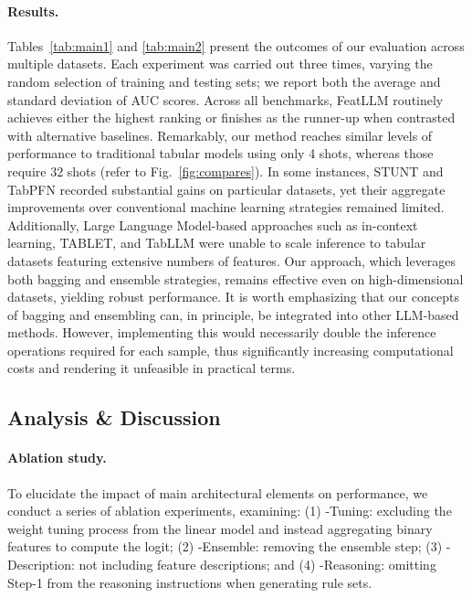 \vspace*{-0.12in}
\paragraph{Results.}
Tables~\ref{tab:main1} and \ref{tab:main2} present the outcomes of our evaluation across multiple datasets. Each experiment was carried out three times, varying the random selection of training and testing sets; we report both the average and standard deviation of AUC scores. Across all benchmarks, \textsf{FeatLLM} routinely achieves either the highest ranking or finishes as the runner-up when contrasted with alternative baselines. Remarkably, our method reaches similar levels of performance to traditional tabular models using only 4 shots, whereas those require 32 shots (refer to Fig.~\ref{fig:compares}). In some instances, STUNT and TabPFN recorded substantial gains on particular datasets, yet their aggregate improvements over conventional machine learning strategies remained limited. Additionally, Large Language Model-based approaches such as in-context learning, TABLET, and TabLLM were unable to scale inference to tabular datasets featuring extensive numbers of features. Our approach, which leverages both bagging and ensemble strategies, remains effective even on high-dimensional datasets, yielding robust performance. It is worth emphasizing that our concepts of bagging and ensembling can, in principle, be integrated into other LLM-based methods. However, implementing this would necessarily double the inference operations required for each sample, thus significantly increasing computational costs and rendering it unfeasible in practical terms.

\subsection{Analysis \& Discussion}
\label{sec:analysis}
\paragraph{Ablation study.} To elucidate the impact of main architectural elements on performance, we conduct a series of ablation experiments, examining: (1) \textsf{-Tuning}: excluding the weight tuning process from the linear model and instead aggregating binary features to compute the logit; (2) \textsf{-Ensemble}: removing the ensemble step; (3) \textsf{-Description}: not including feature descriptions; and (4) \textsf{-Reasoning}: omitting Step-1 from the reasoning instructions when generating rule sets.


